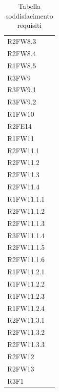 \begin{table}[!htbp]
\begin{tabular}[t]{ m{}<{\centering}  m{}<{\centering} }
	R2FW8.3 & \Ns \\	
	 
	R2FW8.4 & \Ns \\	 
	 
	R1FW8.5 & \Ns \\	 
	 
	R3FW9 & \Ns \\	
	 
	R3FW9.1& \Ns \\	 
	 
	R3FW9.2& \Ns \\	  
	 
	R1FW10 & \So \\	 
	 
	R2FE14& \So \\	 
	 	 
	R1FW11& \So \\	 	
	
	R2FW11.1 & \So \\
 	
	R2FW11.2 & \So \\
 	
	R2FW11.3 & \So \\
 
	R2FW11.4 & \Ns \\
	
	R1FW11.1.1 & \So \\
		
	R2FW11.1.2 & \So \\
		
	R2FW11.1.3 & \So \\
	
	R3FW11.1.4& \Ns \\
	
	R2FW11.1.5& \Ns \\
	
	R2FW11.1.6 & \So \\
	
	R1FW11.2.1 & \So \\

	R1FW11.2.2 & \So \\	
	
	R1FW11.2.3 & \So \\
	
	R1FW11.2.4 & \So \\
	
	R2FW11.3.1 & \So \\
	
	R2FW11.3.2 & \So \\
	
	R2FW11.3.3 & \So \\

	R2FW12& \Ns \\

	R2FW13 & \Ns \\

	R3F1 & \Ns \\


\end{tabular}
\caption{Tabella soddisfacimento requisiti}
\end{table}

